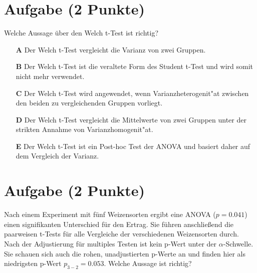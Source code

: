 \documentclass[a4paper, 10pt]{scrartcl}\usepackage[]{graphicx}\usepackage[]{xcolor}
\begin{document}
\section{Aufgabe \hfill (2 Punkte)}

Welche Aussage {\"u}ber den Welch t-Test ist richtig?



\begin{enumerate}
\item [\textbf{A} \msquare] Der Welch t-Test vergleicht die Varianz von zwei Gruppen.
\item [\textbf{B} \msquare] Der Welch t-Test ist die veraltete Form des Student t-Test und wird somit nicht mehr verwendet.
\item [\textbf{C} \msquare] Der Welch t-Test wird angewendet, wenn Varianzheterogenit{"a}t zwischen den beiden zu vergleichenden Gruppen vorliegt.
\item [\textbf{D} \msquare] Der Welch t-Test vergleicht die Mittelwerte von zwei Gruppen unter der strikten Annahme von Varianzhomogenit{"a}t.
\item [\textbf{E} \msquare] Der Welch t-Test ist ein Post-hoc Test der ANOVA und basiert daher auf dem Vergleich der Varianz.
\end{enumerate}

\section{Aufgabe \hfill (2 Punkte)}

Nach einem Experiment mit f{\"u}nf Weizensorten ergibt eine ANOVA ($p = 0.041$)
einen signifikanten Unterschied f{\"u}r den Ertrag. Sie f{\"u}hren anschlie{\ss}end die
paarweisen t-Tests f{\"u}r alle Vergleiche der verschiedenen Weizensorten
durch. Nach der Adjustierung f{\"u}r multiples Testen ist kein p-Wert unter der
$\alpha$-Schwelle. Sie schauen sich auch die rohen, unadjustierten p-Werte
an und finden hier als niedrigsten p-Wert $p_{3-2} = 0.053$. Welche Aussage
ist richtig? 
\end{document}
